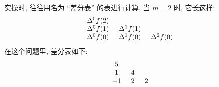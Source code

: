 \begin{example}
    实操时, 往往用名为 ``差分表'' 的表进行计算. 当 $m = 2$ 时, 它长这样:
    \begin{align*}
        \arraycolsep=0.25cm
        \begin{array}{ccc}
            \Delta^{0} f(2) & \               & \               \\
            \Delta^{0} f(1) & \Delta^{1} f(1) & \               \\
            \Delta^{0} f(0) & \Delta^{1} f(0) & \Delta^{2} f(0) \\
        \end{array}
    \end{align*}
    在这个问题里, 差分表如下:
    \begin{align*}
        \arraycolsep=0.25cm
        \begin{array}{ccc}
            5  & \  & \ \\
            1  & 4  & \ \\
            -1 & 2  & 2 \\
        \end{array}
    \end{align*}
\end{example}

